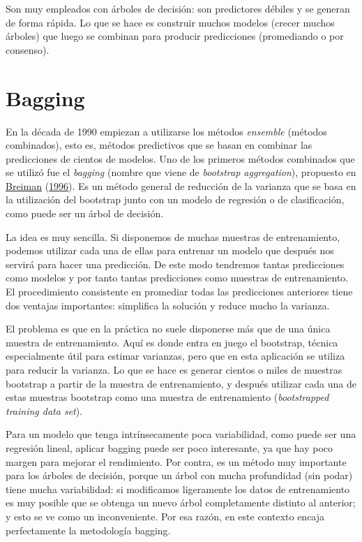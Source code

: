 \documentclass[
  spanish,
]{book}
\theoremstyle{break}
\theoremstyle{definition}
\theoremstyle{definition}
\theoremstyle{definition}
\theoremstyle{definition}
\theoremstyle{remark}
\begin{document}
Son muy empleados con árboles de decisión: son predictores débiles y se generan de forma rápida.
Lo que se hace es construir muchos modelos (crecer muchos árboles) que luego se combinan para producir predicciones (promediando o por consenso).

\hypertarget{bagging}{%
\section{Bagging}\label{bagging}}

En la década de 1990 empiezan a utilizarse los métodos \emph{ensemble} (métodos combinados), esto es, métodos predictivos que se basan en combinar las predicciones de cientos de modelos.
Uno de los primeros métodos combinados que se utilizó fue el \emph{bagging} (nombre que viene de \emph{bootstrap aggregation}), propuesto en \protect\hyperlink{ref-breiman1996bagging}{Breiman} (\protect\hyperlink{ref-breiman1996bagging}{1996}).
Es un método general de reducción de la varianza que se basa en la utilización del bootstrap junto con un modelo de regresión o de clasificación, como puede ser un árbol de decisión.

La idea es muy sencilla.
Si disponemos de muchas muestras de entrenamiento, podemos utilizar cada una de ellas para entrenar un modelo que después nos servirá para hacer una predicción.
De este modo tendremos tantas predicciones como modelos y por tanto tantas predicciones como muestras de entrenamiento.
El procedimiento consistente en promediar todas las predicciones anteriores tiene dos ventajas importantes: simplifica la solución y reduce mucho la varianza.

El problema es que en la práctica no suele disponerse más que de una única muestra de entrenamiento.
Aquí es donde entra en juego el bootstrap, técnica especialmente útil para estimar varianzas, pero que en esta aplicación se utiliza para reducir la varianza.
Lo que se hace es generar cientos o miles de muestras bootstrap a partir de la muestra de entrenamiento, y después utilizar cada una de estas muestras bootstrap como una muestra de entrenamiento (\emph{bootstrapped training data set}).

Para un modelo que tenga intrínsecamente poca variabilidad, como puede ser una regresión lineal, aplicar bagging puede ser poco interesante, ya que hay poco margen para mejorar el rendimiento.
Por contra, es un método muy importante para los árboles de decisión, porque un árbol con mucha profundidad (sin podar) tiene mucha variabilidad: si modificamos ligeramente los datos de entrenamiento es muy posible que se obtenga un nuevo árbol completamente distinto al anterior; y esto se ve como un inconveniente.
Por esa razón, en este contexto encaja perfectamente la metodología bagging.
\end{document}

